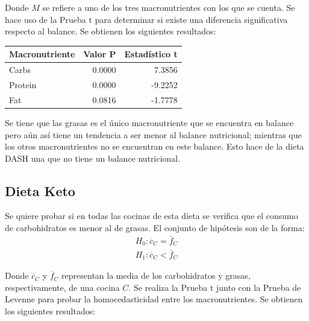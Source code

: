 \documentclass[12pt,a4paper]{article}
\begin{document}
{{            Donde $M$ se refiere a uno de los tres macronutrientes con los que 
            se cuenta. Se hace uso de la Prueba t para determinar si existe 
            una diferencia significativa respecto al balance. Se obtienen 
            los siguientes resultados:

            \begin{center}
                \begin{tabular}{lrr}
                \toprule
                    Macronutriente & Valor P & Estadístico t \\
                \midrule
                    Carbs   & 0.0000 &  7.3856 \\
                    Protein & 0.0000 & -9.2252 \\
                    Fat     & 0.0816 & -1.7778 \\
                \bottomrule
                \end{tabular}
            \end{center}

            Se tiene que las grasas es el único macronutriente que se encuentra en 
            balance pero aún así tiene un tendencia a ser menor al balance nutricional; 
            mientras que los otros macronutrientes no se encuentran en este balance.
             Esto hace 
            de la dieta DASH una que no tiene un balance nutricional.
        }

        \subsection{Dieta Keto}
        {
            Se quiere probar si en todas las cocinas de esta dieta 
            se verifica que el consumo de carbohidratos es menor al de grasas. 
            El conjunto de hipótesis son de la forma:
            \begin{align*}
                H_0 : \overline{c}_C = \overline{f}_C \\
                H_1 : \overline{c}_C < \overline{f}_C
            \end{align*}

            Donde $\overline{c}_C$ y $\overline{f}_C$ representan 
            la media de los carbohidratos y grasas, respectivamente, de 
            una cocina $C$. Se realiza la Prueba t junto con la Prueba de Levenne para 
            probar la homocedasticidad entre los macronutrientes. Se 
            obtienen los siguientes resultados:

}}
\end{document}
